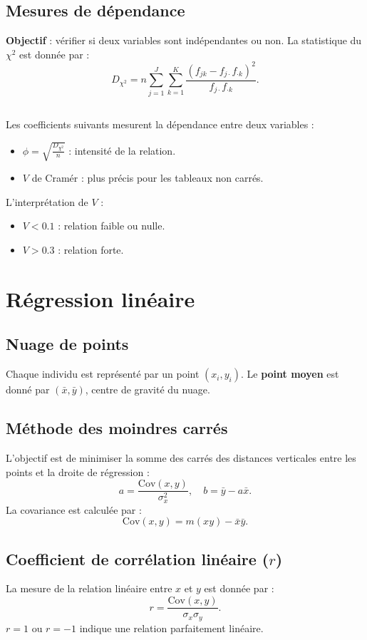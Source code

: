 \documentclass{article}
\begin{document}
\subsection*{Mesures de dépendance}
\textbf{Objectif} : vérifier si deux variables sont indépendantes ou non. La statistique du \(\chi^2\) est donnée par :
\[
D_{\chi^2} = n \sum_{j=1}^{J} \sum_{k=1}^{K} \frac{(f_{jk} - f_{j\cdot} f_{\cdot k})^2}{f_{j\cdot} f_{\cdot k}}.
\]
\subsection*{}
Les coefficients suivants mesurent la dépendance entre deux variables :
\begin{itemize}
    \item \(\phi = \sqrt{\frac{D_{\chi^2}}{n}}\) : intensité de la relation.
    \item \(V\) de Cramér : plus précis pour les tableaux non carrés.
\end{itemize}
L'interprétation de \(V\) :
\begin{itemize}
    \item \(V < 0.1\) : relation faible ou nulle.
    \item \(V > 0.3\) : relation forte.
\end{itemize}

\section*{Régression linéaire}

\subsection*{Nuage de points}
Chaque individu est représenté par un point \((x_i, y_i)\). Le \textbf{point moyen} est donné par \((\bar{x}, \bar{y})\), centre de gravité du nuage.

\subsection*{Méthode des moindres carrés}
L'objectif est de minimiser la somme des carrés des distances verticales entre les points et la droite de régression :
\[
a = \frac{\text{Cov}(x, y)}{\sigma_x^2}, \quad b = \bar{y} - a \bar{x}.
\]
La covariance est calculée par :
\[
\text{Cov}(x, y) = m(xy) - \bar{x} \bar{y}.
\]

\subsection*{Coefficient de corrélation linéaire (\(r\))}
La mesure de la relation linéaire entre \(x\) et \(y\) est donnée par :
\[
r = \frac{\text{Cov}(x, y)}{\sigma_x \sigma_y}.
\]
\(r = 1\) ou \(r = -1\) indique une relation parfaitement linéaire.
\end{document}
